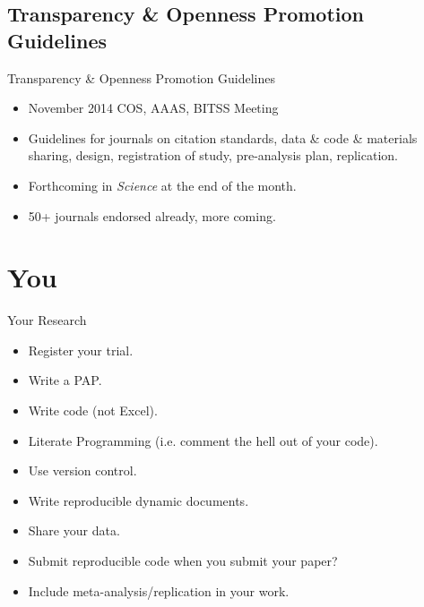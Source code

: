 \documentclass{beamer}
\begin{document}
\subsection{Transparency \& Openness Promotion Guidelines}
\begin{frame}{Transparency \& Openness Promotion Guidelines}
\begin{itemize}
\item November 2014 COS, AAAS, BITSS Meeting

\item Guidelines for journals on citation standards, data \& code \& materials sharing, design, registration of study, pre-analysis plan, replication.

\item Forthcoming in \textit{Science} at the end of the month. 

\item 50+ journals endorsed already, more coming.
\end{itemize} 
\end{frame}
\section{You}
\begin{frame}{Your Research}
\begin{itemize}
\item Register your trial.
\item Write a PAP.
\item Write code (not Excel).
\item Literate Programming (i.e. comment the hell out of your code).
\item Use version control.
\item Write reproducible dynamic documents.
\item Share your data.
\item Submit reproducible code when you submit your paper?
\item Include meta-analysis/replication in your work.
\end{itemize}
\end{frame}
\end{document}
